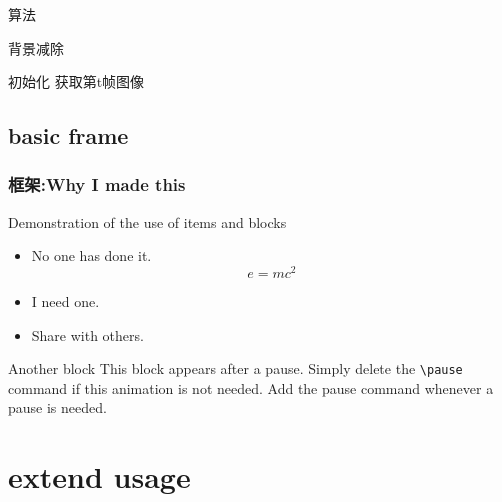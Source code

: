 \documentclass[UTF8]{beamer}
\begin{document}
\begin{frame}{算法}
    \begin{algorithm}[H]
        \caption{背景减除}
        \begin{algorithmic}[1]
            \STATE 初始化
            \REPEAT
            \STATE 获取第t帧图像
        \end{algorithmic}
    \end{algorithm}
\end{frame}

\subsection{basic frame}

\begin{frame}[allowframebreaks]
\frametitle{框架:Why I made this}
\begin{block}{Demonstration of the use of items and blocks}
\begin{itemize}
\item No one has done it.$$e=mc^2$$
\item I need one.
\pause \item Share with others.
\end{itemize}
\end{block}
\pause
\begin{block}{Another block}
This block appears after a pause. Simply delete the \texttt{\textbackslash pause} command if this animation is not needed. Add the pause command whenever a pause is needed. 
\end{block}
\end{frame}

\section{extend usage}
\end{document}
